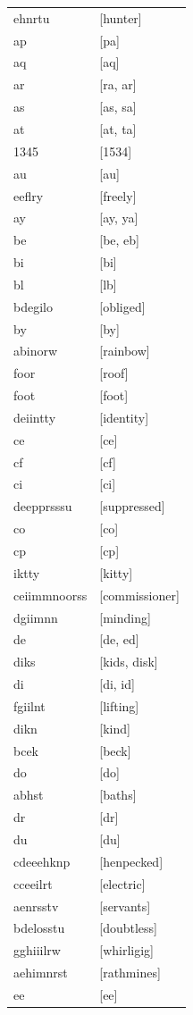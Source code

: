 \documentclass{article}
\begin{document}
\begin{tabular}{ll}
ehnrtu & [hunter] \\
ap & [pa] \\
aq & [aq] \\
ar & [ra, ar] \\
as & [as, sa] \\
at & [at, ta] \\
1345 & [1534] \\
au & [au] \\
eeflry & [freely] \\
ay & [ay, ya] \\
be & [be, eb] \\
bi & [bi] \\
bl & [lb] \\
bdegilo & [obliged] \\
by & [by] \\
abinorw & [rainbow] \\
foor & [roof] \\
foot & [foot] \\
deiintty & [identity] \\
ce & [ce] \\
cf & [cf] \\
ci & [ci] \\
deepprsssu & [suppressed] \\
co & [co] \\
cp & [cp] \\
iktty & [kitty] \\
ceiimmnoorss & [commissioner] \\
dgiimnn & [minding] \\
de & [de, ed] \\
diks & [kids, disk] \\
di & [di, id] \\
fgiilnt & [lifting] \\
dikn & [kind] \\
bcek & [beck] \\
do & [do] \\
abhst & [baths] \\
dr & [dr] \\
du & [du] \\
cdeeehknp & [henpecked] \\
cceeilrt & [electric] \\
aenrsstv & [servants] \\
bdelosstu & [doubtless] \\
gghiiilrw & [whirligig] \\
aehimnrst & [rathmines] \\
ee & [ee] \\

\end{tabular}
\end{document}
